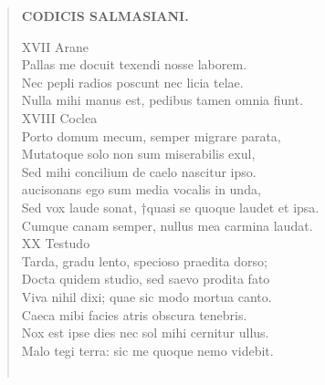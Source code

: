 \documentclass[11pt, a4paper]{report}
\begin{document}
\begin{verse}
    \begin{center} \textbf{CODICIS SALMASIANI.} \end{center} \marginpar{[227]} XVII Arane \\ Pallas me docuit texendi nosse laborem. \\ Nec pepli radios poscunt nec licia telae. \\ Nulla mihi manus est, pedibus tamen omnia fiunt. \\ XVIII Coclea \\ Porto domum mecum, semper migrare parata, \\ Mutatoque solo non sum miserabilis exul, \\ Sed mihi concilium de caelo nascitur ipso. \\ aucisonans ego sum media vocalis in unda, \\ Sed vox laude sonat, †quasi se quoque laudet et ipsa. \\ Cumque canam semper, nullus mea carmina laudat. \\ XX Testudo \\ Tarda, gradu lento, specioso praedita dorso; \\ Docta quidem studio, sed saevo prodita fato \\ Viva nihil dixi; quae sic modo mortua canto. \\ Caeca mibi facies atris obscura tenebris. \\ Nox est ipse dies nec sol mihi cernitur ullus. \\ Malo tegi terra: sic me quoque nemo videbit. \\ 
        ﻿\pagebreak 

\end{verse}
\end{document}
